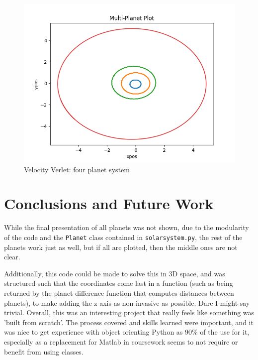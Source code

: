\documentclass[12pt]{article} %
\begin{document}
\begin{figure}
	\includegraphics[scale=\scaleA]{verlet_multiplanet.png}
	\centering
	\caption{Velocity Verlet: four planet system}
	\label{fig:verletmultiplanet}
\end{figure}

\section{Conclusions and Future Work}
While the final presentation of all planets was not shown, due to the modularity of the code and the \texttt{Planet} class contained in \texttt{solarsystem.py}, the rest of the planets work just as well, but if all are plotted, then the middle ones are not clear.

Additionally, this code could be made to solve this in 3D space, and was structured such that the coordinates come last in a function (such as being returned by the planet difference function that computes distances between planets), to make adding the z axis as non-invasive as possible. Dare I might say trivial. Overall, this was an interesting project that really feels like something was 'built from scratch'. The process covered and skills learned were important, and it was nice to get experience with object orienting Python as 90\% of the use for it, especially as a replacement for Matlab in coursework seems to not require or benefit from using classes.
\end{document}
